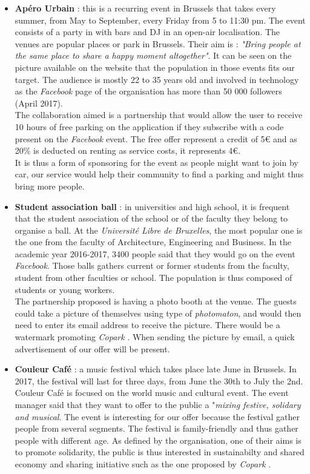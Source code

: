 \documentclass[12pt,a4paper,oneside]{book}
\newcommand{\bp}{\textit{Copark }}
\begin{document}
\begin{itemize}
\item \textbf{Apéro Urbain} : this is a recurring event in Brussels that takes every summer, from May to September, every Friday from 5 to 11:30 pm. The event consists of a party in with bars and DJ in an open-air localisation. The venues are popular places or park in Brussels. Their aim is : \textit{"Bring people at the same place to share a happy moment altogether"}.\cite{aperourbain} It can be seen on the picture available on the website that the population in those events fits our target. The audience is mostly 22 to 35 years old and involved in technology as the \textit{Facebook} page of the organisation has more than 50 000 followers (April 2017).\\
The collaboration aimed is a partnership that would allow the user to receive 10 hours of free parking on the application if they subscribe with a code present on the \textit{Facebook} event. The free offer represent a credit of 5\euro{} and as 20\% is deducted on renting as service costs, it represents 4\euro{}.\\
It is thus a form of sponsoring for the event as people might want to join by car, our service would help their community to find a parking and might thus bring more people.
\item \textbf{Student association ball} : in universities and high school, it is frequent that the student association of the school or of the faculty they belong to organise a ball. At the \textit{Université Libre de Bruxelles}, the most popular one is the one from the faculty of Architecture, Engineering and Business. In the academic year 2016-2017, 3400 people said that they would go on the event \textit{Facebook}. Those balls gathers current or former students from the faculty, student from other faculties or school. The population is thus composed of students or young workers.\\
The partnership proposed is having a photo booth at the venue. The guests could take a picture of themselves using type of \textit{photomaton}, and would then need to enter its email address to receive the picture. There would be a watermark promoting \bp. When sending the picture by email, a quick advertisement of our offer will be present.
\item \textbf{Couleur Café} : a music festival which takes place late June in Brussels. In 2017, the festival will last for three days, from June the 30th to July the 2nd. Couleur Café is focused on the world music and cultural event. The event manager said that they want to offer to the public a "\textit{mixing festive, solidary and musical}.\cite{rtbfcc} The event is interesting for our offer because the festival gather people from several segments. The festival is family-friendly and thus gather people with different age. As defined by the organisation, one of their aims is to promote solidarity, the public is thus interested in sustainabilty and shared economy and sharing initiative such as the one proposed by \bp.\\

\end{itemize}
\end{document}
